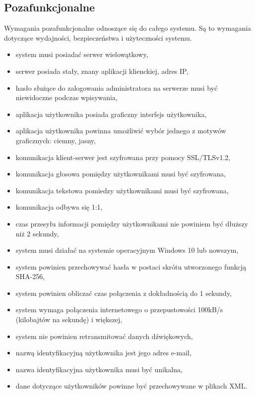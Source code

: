 \documentclass[12pt,a4paper]{article}
\begin{document}
	\subsection{Pozafunkcjonalne}
	Wymagania pozafunkcjonalne odnoszące się do całego systemu. Są to wymagania dotyczące wydajności, bezpieczeństwa i użyteczności systemu.
	\begin{itemize}
		\item system musi posiadać serwer wielowątkowy,
		\item serwer posiada stały, znany aplikacji klienckiej, adres IP,
		\item hasło służące do zalogowania administratora na serwerze musi być niewidoczne podczas wpisywania,
		\item aplikacja użytkownika posiada graficzny interfejs użytkownika,
		\item aplikacja użytkownika powinna umożliwić wybór jednego z motywów graficznych: ciemny, jasny,
		\item komunikacja klient-serwer jest szyfrowana przy pomocy SSL/TLSv1.2,
		\item komunikacja głosowa pomiędzy użytkownikami musi być szyfrowana,
		\item komunikacja tekstowa pomiedzy użytkownikami musi być szyfrowana,
		\item komunikacja odbywa się 1:1,
		\item czas przesyłu informacji pomiędzy użytkownikami nie powiniem być dłuższy niż 2 sekundy,
		\item system musi działać na systemie operacyjnym Windows 10 lub nowszym,
		\item system powinien przechowywać hasła w postaci skrótu utworzonego funkcją SHA-256,
		\item system powinien obliczać czas połączenia z dokładnością do 1 sekundy,
		\item system wymaga połączenia internetowego o przepustowości 100kB/s (kilobajtów na sekundę) i większej,
		\item system nie powinien retransmitować danych dźwiękowych,
		\item nazwą identyfikacyjną użytkownika jest jego adres e-mail,
		\item nazwa identyfikacyjna użytkownika musi być unikalna, 
		\item dane dotyczące użytkowników powinne być przechowywane w plikach XML.
	\end{itemize}
	
\end{document}
